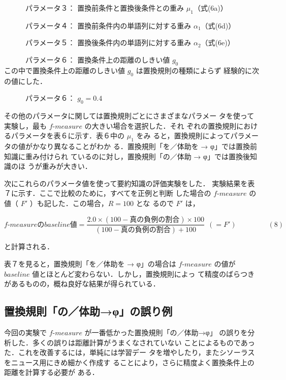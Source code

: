 \begin{flushleft}
　　　{\gt パラメータ３：} 置換前条件と置換後条件との重み $\mu _1$（式(6a)）

　　　{\gt パラメータ４：} 置換前条件内の単語列に対する重み $\alpha _1$（式(6d)）

　　　{\gt パラメータ５：} 置換後条件内の単語列に対する重み $\alpha _2$（式(6e)）

　　　{\gt パラメータ６：} 置換条件上の距離のしきい値  $g_0$ 
\\
この中で置換条件上の距離のしきい値 $g_0$ は置換規則の種類によらず
経験的に次の値にした．

　　　{\gt パラメータ６：} $g_0 = 0.4$
\end{flushleft}

その他のパラメータに関しては置換規則ごとにさまざまなパラメー
タを使って実験し，最も $f‐measure$ の大きい場合を選択した．それ
ぞれの置換規則におけるパラメータを表６に示す．表６中の $\mu _1$ をみ
ると，置換規則によってパラメータの値がかなり異なることがわか
る．置換規則「を／体助を → φ」では置換前知識に重み付けられ
ているのに対し，置換規則「の／体助 → φ」では置換後知識のほ
うが重みが大きい．

\begin{table}
  
  
  
\begin{center}
\end{center}
\end{table}

次にこれらのパラメータ値を使って要約知識の評価実験をした．
実験結果を表７に示す．ここで比較のために，すべてを正例と判断
した場合の $f‐measure$ の値（ $F'$ ）も記した．\mbox{この場}合，$R=100$ とな
るので $F'$ は，

$$ f‐measure のbaseline 値 = \frac{2.0 \times (100-真の負例の割合) \times 100 }{ (100-真の負例の割合) + 100 } \ \ (=F') \ \ \ \ \ \ \ \ \ \ \ \ \ \ \ \ \ \ \ \ (8)$$

\begin{flushleft}
と計算される．
\end{flushleft}

表７を見ると，置換規則「を／体助を → φ」の場合は $f‐measure$ 
の値が $baseline$ 値とほとんど変わらない．しかし，置換規則によっ
て精度のばらつきがあるものの，概ね良好な結果が得られている．

\subsection{置換規則「の／体助→φ」の誤り例}
\label{sec:sec5-3}
今回の実験で $f‐measure$ が一番低かった置換規則「の／体助→φ」
の誤りを分析した．\mbox{多く}の誤りは距離計算がうまくなされていない
ことによるものであった．これを改善するには，単純には学習デー
タを増やしたり，またシソーラスをニュース用にきめ細かく作成す
ることにより，さらに精度よく置換条件上の距離を計算する必要が
ある．

